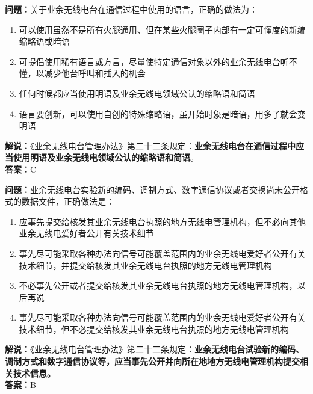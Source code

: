 \bigskip


\noindent\textbf{问题：}关于业余无线电台在通信过程中使用的语言，正确的做法为：
\begin{enumerate}[label=\Alph*), leftmargin=3em]
	\item 可以使用虽然不是所有火腿通用、但在某些火腿圈子内部有一定可懂度的新编缩略语或暗语
	\item 可提倡使用稀有语言或方言，尽量使特定通信对象以外的业余无线电台听不懂，以减少他台呼叫和插入的机会
	\item 任何时候都应当使用明语及业余无线电领域公认的缩略语和简语
	\item 语言要创新，可以使用自创的特殊缩略语，虽开始时象是暗语，用多了就会变明语
\end{enumerate}
\noindent\textbf{解说：}《业余无线电台管理办法》第二十二条规定：\textbf{业余无线电台在通信过程中应当使用明语及业余无线电领域公认的缩略语和简语}。\\\noindent\textbf{答案：}C



\bigskip


\noindent\textbf{问题：}业余无线电台实验新的编码、调制方式、数字通信协议或者交换尚未公开格式的数据文件，正确做法是：
\begin{enumerate}[label=\Alph*), leftmargin=3em]
	\item 应事先提交给核发其业余无线电台执照的地方无线电管理机构，但不必向其他业余无线电爱好者公开有关技术细节
	\item 事先尽可能采取各种办法向信号可能覆盖范围内的业余无线电爱好者公开有关技术细节，并提交给核发其业余无线电台执照的地方无线电管理机构
	\item 不必事先公开或者提交给核发其业余无线电台执照的地方无线电管理机构，以后再说
	\item 事先尽可能采取各种办法向信号可能覆盖范围内的业余无线电爱好者公开有关技术细节，但不必提交给核发其业余无线电台执照的地方无线电管理机构
\end{enumerate}
\noindent\textbf{解说：}《业余无线电台管理办法》第二十二条规定：\textbf{业余无线电台试验新的编码、调制方式和数字通信协议等，应当事先公开并向所在地地方无线电管理机构提交相关技术信息。}\\\noindent\textbf{答案：}B



\bigskip


